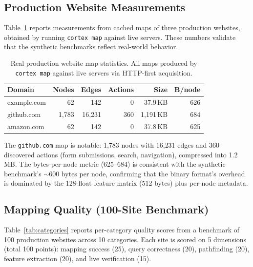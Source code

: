 \documentclass[10pt, twocolumn]{article}
\begin{document}
\subsection{Production Website Measurements}
\label{sec:production}

Table~\ref{tab:realmap} reports measurements from cached maps of three production websites, obtained by running \texttt{cortex map} against live servers. These numbers validate that the synthetic benchmarks reflect real-world behavior.

\begin{table}[t]
\caption{Real production website map statistics. All maps produced by \texttt{cortex map} against live servers via HTTP-first acquisition.}
\label{tab:realmap}
\centering
\small
\begin{tabular}{@{}lrrrrr@{}}
\toprule
\textbf{Domain} & \textbf{Nodes} & \textbf{Edges} & \textbf{Actions} & \textbf{Size} & \textbf{B/node} \\
\midrule
example.com & 62 & 142 & 0 & 37.9\,KB & 626 \\
github.com & 1{,}783 & 16{,}231 & 360 & 1{,}191\,KB & 684 \\
amazon.com & 62 & 142 & 0 & 37.8\,KB & 625 \\
\bottomrule
\end{tabular}
\end{table}

The \texttt{github.com} map is notable: 1{,}783 nodes with 16{,}231 edges and 360 discovered actions (form submissions, search, navigation), compressed into 1.2\,MB. The bytes-per-node metric (625--684) is consistent with the synthetic benchmark's $\sim$600 bytes per node, confirming that the binary format's overhead is dominated by the 128-float feature matrix (512 bytes) plus per-node metadata.

\subsection{Mapping Quality (100-Site Benchmark)}
\label{sec:quality}

Table~\ref{tab:categories} reports per-category quality scores from a benchmark of 100 production websites across 10 categories. Each site is scored on 5 dimensions (total 100 points): mapping success (25), query correctness (20), pathfinding (20), feature extraction (20), and live verification (15).
\end{document}
